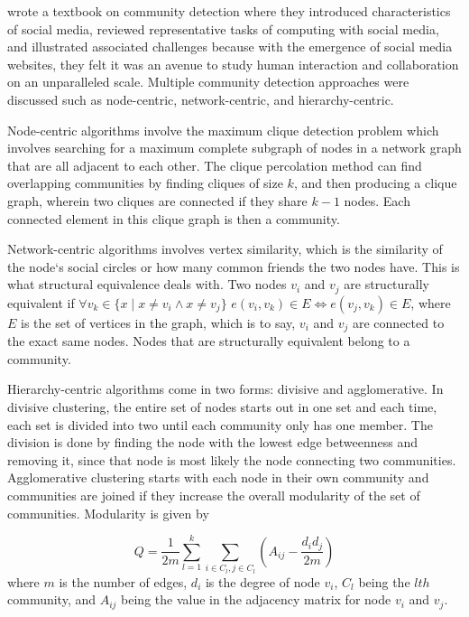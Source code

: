  wrote a textbook on community detection where they introduced characteristics of social media, reviewed representative tasks of computing with social media, and illustrated associated challenges because with the emergence of social media websites, they felt it was an avenue to study human interaction and collaboration on an unparalleled scale. Multiple community detection approaches were discussed such as node-centric, network-centric, and hierarchy-centric. 

Node-centric algorithms involve the maximum clique detection problem which involves searching for a maximum complete subgraph of nodes in a network graph that are all adjacent to each other. The clique percolation method can find overlapping communities by finding cliques of size $k$, and then producing a clique graph, wherein two cliques are connected if they share $k-1$ nodes. Each connected element in this clique graph is then a community.

Network-centric algorithms involves vertex similarity, which is the similarity of the node`s social circles or how many common friends the two nodes have. This is what structural equivalence deals with. Two nodes $v_i$ and $v_j$ are structurally equivalent if $\forall v_k \in \{x \mid x \neq v_i \wedge x \neq v_j \}$ $e(v_i,v_k) \in E \iff e(v_j,v_k) \in E$, where $E$ is the set of vertices in the graph, which is to say, $v_i$ and $v_j$ are connected to the exact same nodes. Nodes that are structurally equivalent belong to a community. 

Hierarchy-centric algorithms come in two forms: divisive and agglomerative. In divisive clustering, the entire set of nodes starts out in one set and each time, each set is divided into two until each community only has one member. The division is done by finding the node with the lowest edge betweenness and removing it, since that node is most likely the node connecting two communities. Agglomerative clustering starts with each node in their own community and communities are joined if they increase the overall modularity of the set of communities. Modularity is given by

\begin{equation}
Q = \frac{1}{2m} \sum_{l = 1}^{k} \sum_{i \in C_l, j \in C_l} (A_{ij} - \frac{d_i d_j}{2m})
\end{equation}where $m$ is the number of edges, $d_i$ is the degree of node $v_i$, $C_l$ being the $lth$ community, and $A_{ij}$ being the value in the adjacency matrix for node $v_i$ and $v_j$.

